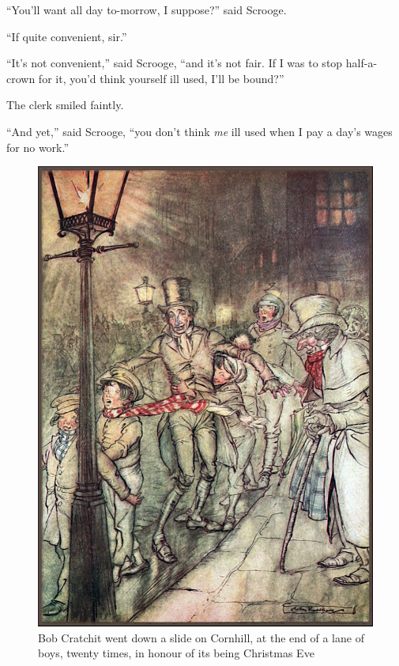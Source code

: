 \documentclass[paper=5.5in:8.5in,BCOR=7mm,twoside,DIV=calc,12pt,usegeometry]{scrbook} %
\begin{document}
\enquote{You'll want all day to-morrow, I suppose?} said Scrooge.

\enquote{If quite convenient, sir.}

\enquote{It's not convenient,} said Scrooge, \enquote{and it's not fair. If I was to stop half-a-crown for it, you'd think yourself ill used, I'll be bound?}

The clerk smiled faintly.

\enquote{And yet,} said Scrooge, \enquote{you don't think \textit{me} ill used when I pay a day's wages for no work.}

\begin{figure}[p]
\begin{minipage}[c]{\linewidth}
\includegraphics[width=\linewidth]{bobslide}
\caption[Bob Cratchit went down a slide]{Bob Cratchit went down a slide on Cornhill, at the end of a lane of boys, twenty times, in honour of its being Christmas Eve}
\end{minipage}
\end{figure}
\end{document}
